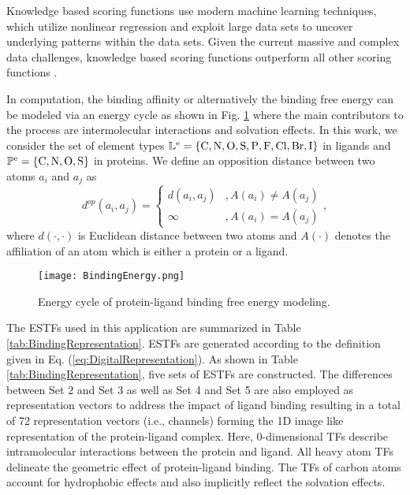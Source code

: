 \documentclass[10pt]{article}
\begin{document}
Knowledge based scoring functions use  modern machine learning techniques, which utilize nonlinear regression and exploit large data sets to uncover  underlying patterns within the data sets. 
Given the current massive and complex data challenges, knowledge based scoring functions outperform all other scoring functions
 \cite{Zheng:2015LISA}.






 In computation, the binding affinity or alternatively the binding free energy can be modeled via an energy cycle as shown in Fig. \ref{fig:BindingEnergy} where the main contributors to the process are intermolecular interactions and solvation effects. In this work, we consider the set of element types $\mathbb{L}^{\rm{e}}=\{\rm C,N,O,S,P,F,Cl,Br,I\}$ in ligands and $\mathbb{P}^{\rm{e}}=\{\rm C,N,O,S\}$ in proteins. We define an opposition distance between two atoms $a_i$ and $a_j$ as 
\begin{equation}\label{eq:Distance}
d^{op}(a_i,a_j)=
\begin{cases}
d(a_i,a_j)&, A(a_i)\neq A(a_j)\\
\infty&, A(a_i)=A(a_j)
\end{cases},
\end{equation}
where $d(\cdot,\cdot)$ is Euclidean distance between two atoms and $A(\cdot)$ denotes the affiliation of an atom which is either a protein or a ligand. 

\begin{figure}[ht]
\begin{center}
\texttt{[image: BindingEnergy.png]}
\caption{Energy cycle of protein-ligand binding free energy modeling.}
\label{fig:BindingEnergy}
\end{center}
\end{figure}

The ESTFs used in this application are summarized in Table \ref{tab:BindingRepresentation}. ESTFs are generated according to the definition given in Eq. (\ref{eq:DigitalRepresentation}). As shown in Table \ref{tab:BindingRepresentation}, five sets of ESTFs are constructed. The differences between Set 2 and Set 3 as well as Set 4 and Set 5  are also employed as representation vectors to address the impact of ligand binding resulting in a total of 72 representation vectors (i.e., channels) forming the 1D image like representation of the protein-ligand complex. Here, 0-dimensional TFs describe  intramolecular interactions between the protein and ligand.  All heavy atom TFs delineate the geometric effect of protein-ligand binding.    The TFs of carbon atoms account for hydrophobic effects and also implicitly reflect the solvation effects. 
\end{document}
